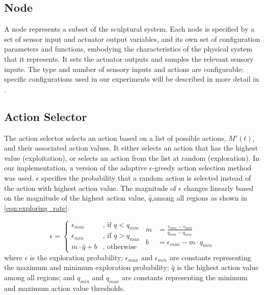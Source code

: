 \subsection{Node}
A node represents a subset of the sculptural system. Each node is specified by a set of sensor input and actuator output variables, and its own set of configuration parameters and functions, embodying the characteristics of the physical system that it represents. It sets the actuator outputs and samples the relevant sensory inputs. The type and number of sensory inputs and actions are configurable; specific configurations used in our experiments will be described in more detail in .

\subsection{Action Selector}

The action selector selects an action based on a list of possible actions, $M'(t)$, and their associated action values. It either selects an action that has the highest value (exploitation), or selects an action from the list at random (exploration). In our implementation, a version of the adaptive $\epsilon$-greedy \cite{Tokic2010} action selection method was used. $\epsilon$ specifies the probability that a random action is selected instead of the action with highest action value. The magnitude of $\epsilon$ changes linearly based on the magnitude of the highest action value, $\widehat{q}$,among all regions  as shown in \eqref{eqn:exploring_rate}. 

\begin{subequations}\label{eqn:exploring_rate}
	\begin{equation}
		\epsilon = 
		\begin{cases}
			\epsilon_{max}  &\text{, if } q < q_{min} \\
			\epsilon_{min}  &\text{, if } q > q_{max} \\
			m \cdot \widehat{q} + b   &\text{, otherwise} 
		\end{cases}
	\end{equation}
	\begin{flalign}
		m &= \frac{\epsilon_{max} - \epsilon_{min}}{q_{min} - q_{max}} \\
		b &= \epsilon_{max} - m \cdot q_{min} 
	\end{flalign}
\end{subequations}
where $\epsilon$ is the exploration probability; $\epsilon_{max}$ and $\epsilon_{min}$ are constants representing the maximum and minimum exploration probability; $\widehat{q}$ is the highest action value among all regions; and $q_{min}$ and $q_{max}$ are constants representing the minimum and maximum action value thresholds.

